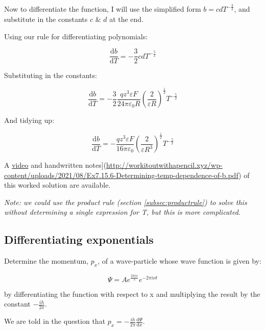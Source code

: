 \documentclass[
]{book}
\begin{document}
Now to differentiate the function, I will use the simplified form \(b=cdT^{-\frac{3}{2}}\), and substitute in the constants \(c\) \& \(d\) at the end.

Using our rule for differentiating polynomials:

\begin{equation*}
\frac{\textrm{d}b}{\textrm{d}T}=-\frac{3}{2}cdT^{-\frac{5}{2}}
\end{equation*}

Substituting in the constants:

\begin{equation*}
\frac{\textrm{d}b}{\textrm{d}T}=-\frac{3}{2}\frac{qz^3\varepsilon F}{24 \pi \varepsilon_0R}\left( \frac{2}{ \varepsilon R} \right)^{\frac{1}{2}}T^{-\frac{5}{2}}
\end{equation*}

And tidying up:

\begin{equation*}
\frac{\textrm{d}b}{\textrm{d}T}=-\frac{qz^3\varepsilon F}{16 \pi \varepsilon_0}\left( \frac{2}{ \varepsilon R^3} \right)^{\frac{1}{2}}T^{-\frac{5}{2}}
\end{equation*}

A \href{https://youtu.be/h5FCt75G-Us}{video} and handwritten notes{]}(\url{http://workitoutwithapencil.xyz/wp-content/uploads/2021/08/Ex7.15.6-Determining-temp-dependence-of-b.pdf}) of this worked solution are available.

\emph{Note: we could use the product rule (section \ref{subsec:productrule}) to solve this without determining a single expression for T, but this is more complicated.}

\hypertarget{subsec:exdiffexp}{%
\subsection{Differentiating exponentials}\label{subsec:exdiffexp}}

Determine the momentum, \(p_x\), of a wave-particle whose wave function is given by:

\begin{equation*}
\Psi = A e^{\frac{2 \pi i x}{\lambda}} e^{-2 \pi i \nu t}
\end{equation*}

by differentiating the function with respect to x and multiplying the result by the constant \(-\frac{ih}{2 \pi}\).

We are told in the question that \(p_x=-\frac{ih}{2 \pi}\frac{\textrm{d}\Psi}{\textrm{d}x}\).
\end{document}
